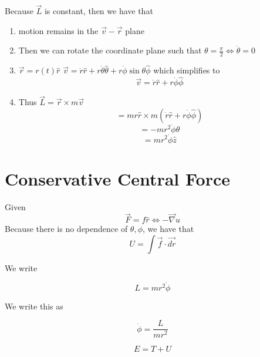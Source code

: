\documentclass{article}
\newtheorem{one minute paper}[theorem]{One Minute Paper}
\begin{document}
Because $\vec{L}$ is constant, then we have that 
\begin{enumerate}
    \item motion remains in the $\vec{v} - \vec{r}$ plane
    \item Then we can rotate the coordinate plane such that $\theta = \frac{\pi}{2} \iff \dot{\theta} = 0$
    \item $\vec{r} = r(t)\hat{r}$
    $\vec{v} = \dot{r}\hat{r} + r\dot{\theta}\hat{\theta} + r\dot{\phi}\sin\theta\hat{\phi}$ which simplifies to 
    \begin{equation}
        \vec{v} = \dot{r}\hat{r} + r\dot{\phi}\hat{\phi}
    \end{equation}
    \item Thus $\vec{L} = \vec{r} \times m\vec{v}$
     \begin{equation}
        = mr\hat{r} \times m(\dot{r}\hat{r} + r\dot{\phi}\hat{\phi})
     \end{equation}
     \begin{equation}
        = -mr^2\dot{\phi}\hat{\theta}
     \end{equation}
     \begin{equation}
        = mr^2\dot{\phi}\hat{z}
     \end{equation}
\end{enumerate}

\section*{Conservative Central Force}

Given 
\begin{equation}
    \vec{F} = f\hat{r} \iff -\vec{\nabla}u
\end{equation}
Because there is no dependence of $\theta, \phi$, we have that 
\begin{equation}
    U = \int \vec{f} \cdot \vec{dr}
\end{equation}

We write 

\begin{equation}
    L = mr^2\dot{\phi}
\end{equation}

We write this as 

\begin{equation}
    \dot{\phi} = \frac{L}{mr^2}
\end{equation}

\begin{equation}
    E = T + U
\end{equation}
\end{document}

